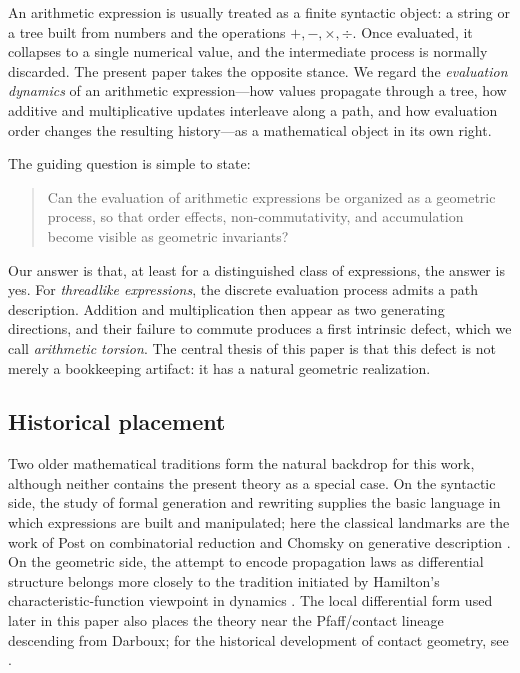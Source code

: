 An arithmetic expression is usually treated as a finite syntactic object: a string or a tree built from numbers and the operations $+,-,\times,\div$. Once evaluated, it collapses to a single numerical value, and the intermediate process is normally discarded. The present paper takes the opposite stance. We regard the \emph{evaluation dynamics} of an arithmetic expression---how values propagate through a tree, how additive and multiplicative updates interleave along a path, and how evaluation order changes the resulting history---as a mathematical object in its own right.

The guiding question is simple to state:

\begin{quote}
Can the evaluation of arithmetic expressions be organized as a geometric process, so that order effects, non-commutativity, and accumulation become visible as geometric invariants?
\end{quote}

Our answer is that, at least for a distinguished class of expressions, the answer is yes. For \emph{threadlike expressions}, the discrete evaluation process admits a path description. Addition and multiplication then appear as two generating directions, and their failure to commute produces a first intrinsic defect, which we call \emph{arithmetic torsion}. The central thesis of this paper is that this defect is not merely a bookkeeping artifact: it has a natural geometric realization.

\subsection{Historical placement}

Two older mathematical traditions form the natural backdrop for this work, although neither contains the present theory as a special case. On the syntactic side, the study of formal generation and rewriting supplies the basic language in which expressions are built and manipulated; here the classical landmarks are the work of Post on combinatorial reduction and Chomsky on generative description \cite{Post1943FormalRO,Chomsky1956ThreeMF}. On the geometric side, the attempt to encode propagation laws as differential structure belongs more closely to the tradition initiated by Hamilton's characteristic-function viewpoint in dynamics \cite{Hamilton1834GeneralMethod}. The local differential form used later in this paper also places the theory near the Pfaff/contact lineage descending from Darboux; for the historical development of contact geometry, see \cite{Darboux1882Pfaff,Geiges2001BriefHistory}.

